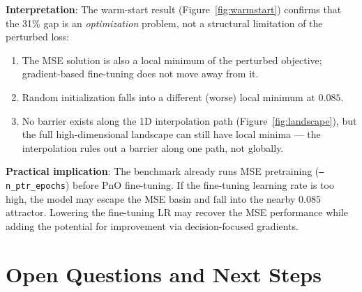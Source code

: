 \documentclass[11pt]{article}
\begin{document}
\textbf{Interpretation}: The warm-start result (Figure~\ref{fig:warmstart})
confirms that the 31\% gap is an \emph{optimization} problem, not a
structural limitation of the perturbed loss:
\begin{enumerate}[itemsep=2pt]
  \item The MSE solution is also a local minimum of the perturbed
        objective; gradient-based fine-tuning does not move away from it.
  \item Random initialization falls into a different (worse) local
        minimum at $0.085$.
  \item No barrier exists along the 1D interpolation path
        (Figure~\ref{fig:landscape}), but the full high-dimensional
        landscape can still have local minima --- the interpolation
        rules out a barrier along one path, not globally.
\end{enumerate}

\textbf{Practical implication}: The benchmark already runs MSE pretraining
(\texttt{--n\_ptr\_epochs}) before PnO fine-tuning.  If the fine-tuning
learning rate is too high, the model may escape the MSE basin and fall
into the nearby $0.085$ attractor.  Lowering the fine-tuning LR may
recover the MSE performance while adding the potential for improvement
via decision-focused gradients.

\section{Open Questions and Next Steps}
\end{document}
